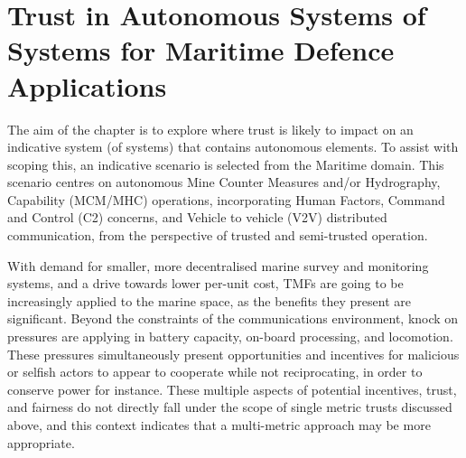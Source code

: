 \def\ChapterTitle{Trust in Autonomous Systems of Systems for Maritime Defence Applications}

\ifx\ifthesis\undefined

\else
\chapter{\ChapterTitle}
\label{Chapter\thechapter}
\fi

The aim of the chapter is to explore where trust is likely to impact on an indicative system (of systems) that contains autonomous elements. To assist with scoping this, an indicative scenario is selected from the Maritime domain.  This scenario centres on autonomous Mine Counter  Measures and/or Hydrography, Capability (MCM/MHC) operations, incorporating Human Factors, Command and Control (C2) concerns, and Vehicle to vehicle (V2V) distributed communication, from the perspective of trusted and semi-trusted operation. 

With demand for smaller, more decentralised marine survey and monitoring systems, and a drive towards lower per-unit cost, TMFs are going to be increasingly applied to the marine space, as the benefits they present are significant.
Beyond the constraints of the communications environment, knock on pressures are applying in battery capacity, on-board processing, and locomotion.
These pressures simultaneously present opportunities and incentives for malicious or selfish actors to appear to cooperate while not reciprocating, in order to conserve power for instance.
These multiple aspects of potential incentives, trust, and fairness do not directly fall under the scope of single metric trusts discussed above, and this context indicates that a multi-metric approach may be more appropriate.


